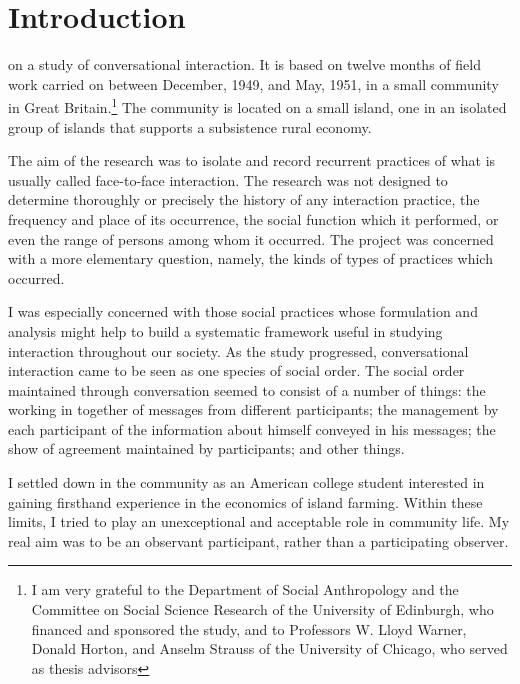 \documentclass[openany,nobib]{tufte-book}
\let\oldchapter\chapter
\def\chapter{%
  \setcounter{footnote}{0}%
  \oldchapter
}
\begin{document}


\chapter[INTRODUCTION]{Introduction}
\label{ch:Introduction}

on a study of conversational interaction. It is based
on twelve months of field work carried on between December, 1949, and
May, 1951, in a small community in Great Britain.\footnote{I am very
  grateful to the Department of Social Anthropology and the Committee on
  Social Science Research of the University of Edinburgh, who financed
  and sponsored the study, and to Professors W. Lloyd Warner, Donald
  Horton, and Anselm Strauss of the University of Chicago, who served as
  thesis advisors} The community is located on a small island, one in an
isolated group of islands that supports a subsistence rural economy.

The aim of the research was to isolate and record recurrent practices of
what is usually called face-to-face interaction. The research was not
designed to determine thoroughly or precisely the history of any
interaction practice, the frequency and place of its occurrence, the
social function which it performed, or even the range of persons among
whom it occurred. The project was concerned with a more elementary
question, namely, the kinds of types of practices which occurred.

I was especially concerned with those social practices whose formulation
and analysis might help to build a systematic framework useful in
studying interaction throughout our society. As the study progressed,
conversational interaction came to be seen as one species of social
order. The social order maintained through conversation seemed to
consist of a number of things: the working in together of messages from
different participants; the management by each participant of the
information about himself conveyed in his messages; the show of
agreement maintained by participants; and other things.

I settled down in the community as an American college student
interested in gaining firsthand experience in the economics of island
farming. Within these limits, I tried to play an unexceptional and
acceptable role in community life. My real aim was to be an observant
participant, rather than a participating observer.
\end{document}
